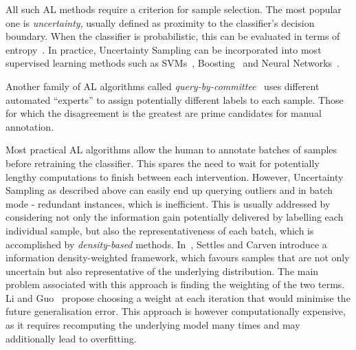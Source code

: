 \documentclass[10pt,twocolumn,letterpaper]{article}
\begin{document}
All such AL  methods require a criterion for sample  selection. The most popular
one  is {\it  uncertainty}, usually  defined  as proximity  to the  classifier's
decision  boundary. When  the  classifier  is probabilistic,  this can  be
evaluated   in   terms   of   entropy~\cite{Settles08b}. In practice, Uncertainty Sampling can be incorporated into
most         supervised         learning         methods         such         as
SVMs~\cite{Tong02}, Boosting~\cite{Huang07} and Neural Networks~\cite{Cohn96}.

Another family of AL  algorithms called {\it query-by-committee}~\cite{Dagan95} uses
different automated ``experts''  to assign potentially different  labels to each
sample. Those  for which the disagreement is the greatest are prime  candidates for
manual annotation.

Most practical  AL algorithms  allow the  human to  annotate batches  of samples
before  retraining  the classifier.   This  spares  the need to wait  for 
potentially lengthy computations to finish between each intervention.
However, Uncertainty Sampling as described above can easily end up
querying outliers and in batch mode - redundant instances, which is inefficient. This is usually
addressed by considering not only the information gain potentially delivered
by  labelling  each individual  sample,  but  also  the representativeness of  each
batch, which is accomplished by \textit{density-based} methods. In~\cite{Settles08b}, Settles and Carven introduce a information density-weighted framework, which favours samples that are not only uncertain but also representative of the underlying distribution. The main problem associated with this approach is finding the weighting of the two terms. Li and Guo~\cite{Li2013} propose choosing a weight at each iteration that would minimise the future generalisation error. This approach is however computationally expensive, as it requires recomputing the underlying model many times and may additionally lead to overfitting.     
\end{document}
